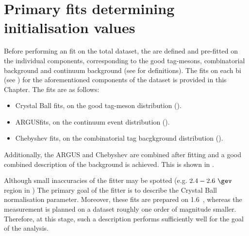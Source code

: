 \chapter{Primary \texorpdfstring{\Mbc}{Mbc} fits determining initialisation values}\label{sec:appendix_primary_fits}
Before performing an \Mbc fit on the total dataset, the  are defined and pre-fitted on the individual components, corresponding to the good tag-\B mesons, combinatorial \BB background and continuum background (see  for definitions).
The \Mbc fits on each \EB bi (see ) for the aforementioned components of the dataset is provided in this Chapter.
The fits are as follows:
\begin{itemize}
    \item Crystal Ball \PDF fits, on the good tag-\B meson \Mbc distribution ().
    \item ARGUS\PDF fits, on the continuum event \Mbc distribution ().
    \item Chebyshev \PDF fits, on the combinatorial \BB tag bacgkground distribution ().
\end{itemize}

Additionally, the ARGUS and Chebyshev  are combined after fitting and a good combined description of the background is achieved.
This is shown in  .

Although small inaccuracies of the fitter may be spotted (e.g. $2.4-2.6~\gev$ region in ) The primary goal of the fitter is to describe the Crystal Ball normalisation parameter.
Moreover, these fits are prepared on 1.6~\invab, whereas the measurement is planned on a dataset roughly one order of magnitude smaller.
Therefore, at this stage, such a description performs sufficiently well for the goal of the analysis.

